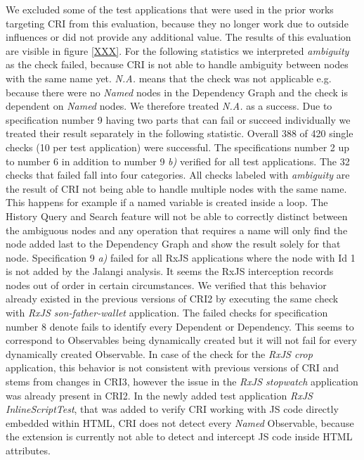 We excluded some of the test applications that were used in the prior works targeting CRI from this evaluation, because they no longer work due to outside influences or did not provide any additional value. The results of this evaluation are visible in figure \ref{XXX}. For the following statistics we interpreted \emph{ambiguity} as the check failed, because CRI is not able to handle ambiguity between nodes with the same name yet. \emph{N.A.} means that the check was not applicable e.g. because there were no \emph{Named} nodes in the Dependency Graph and the check is dependent on \emph{Named} nodes. We therefore treated \emph{N.A.} as a success. Due to specification number 9 having two parts that can fail or succeed individually we treated their result separately in the following statistic. Overall 388 of 420 single checks (10 per test application) were successful. The specifications number 2 up to number 6 in addition to number 9 \emph{b)} verified for all test applications. The 32 checks that failed fall into four categories. All checks labeled with \emph{ambiguity} are the result of CRI not being able to handle multiple nodes with the same name. This happens for example if a named variable is created inside a loop. The History Query and Search feature will not be able to correctly distinct between the ambiguous nodes and any operation that requires a name will only find the node added last to the Dependency Graph and show the result solely for that node. Specification 9 \emph{a)} failed for all RxJS applications where the node with Id 1 is not added by the Jalangi analysis. It seems the RxJS interception records nodes out of order in certain circumstances. We verified that this behavior already existed in the previous versions of CRI2 by executing the same check with \emph{RxJS son-father-wallet} application. The failed checks for specification number 8 denote fails to identify every Dependent or Dependency. This seems to correspond to Observables being dynamically created but it will not fail for every dynamically created Observable. In case of the check for the \emph{RxJS crop} application, this behavior is not consistent with previous versions of CRI and stems from changes in CRI3, however the issue in the \emph{RxJS stopwatch} application was already present in CRI2.
In the newly added test application \emph{RxJS InlineScriptTest}, that was added to verify CRI working with JS code directly embedded within HTML, CRI does not detect every \emph{Named} Observable, because the extension is currently not able to detect and intercept JS code inside HTML attributes.
